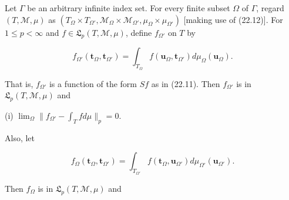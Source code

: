 Let $\Gamma$ be an arbitrary infinite index set. For every finite subset $\Omega$ of $\Gamma$, regard $(T, \mathcal{M}, \mu)$ as $(T_{\Omega} \times T_{\Omega'}, \mathcal{M}_{\Omega} \times \mathcal{M}_{\Omega'}, \mu_{\Omega} \times \mu_{\Omega'})$ [making use of (22.12)]. For $1 \leq p < \infty$ and $f \in \mathfrak{L}_p(T, \mathcal{M}, \mu)$, define $f_{\Omega'}$ on $T$ by

$$f_{\Omega'}(\mathbf{t}_{\Omega}, \mathbf{t}_{\Omega'}) = \int_{T_{\Omega}} f(\mathbf{u}_{\Omega}, \mathbf{t}_{\Omega'}) d\mu_{\Omega}(\mathbf{u}_{\Omega}).$$

That is, $f_{\Omega'}$ is a function of the form $Sf$ as in (22.11). Then $f_{\Omega'}$ is in $\mathfrak{L}_p(T, \mathcal{M}, \mu)$ and

(i) $\lim_{\Omega} \|f_{\Omega'} - \int_{T} f d\mu\|_p = 0.$

Also, let

$$f_{\Omega}(\mathbf{t}_{\Omega}, \mathbf{t}_{\Omega'}) = \int_{T_{\Omega'}} f(\mathbf{t}_{\Omega}, \mathbf{u}_{\Omega'}) d\mu_{\Omega'}(\mathbf{u}_{\Omega'}).$$

Then $f_{\Omega}$ is in $\mathfrak{L}_p(T, \mathcal{M}, \mu)$ and

